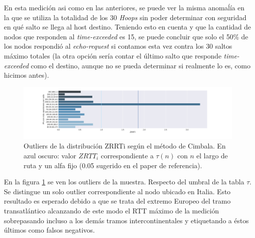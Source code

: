 En esta medición asi como en las anteriores, se puede ver la misma anomaĺía en la que se utiliza la totalidad de los 30 \emph{Hoops} sin poder determinar con seguridad en qué salto se llega al host destino. Teniendo esto en cuenta y que la cantidad de nodos que responden al \emph{time-exceeded} es 15, se puede concluir que solo el 50\% de los nodos respondió al \emph{echo-request} si contamos esta vez contra los 30 saltos máximo totales (la otra opción sería contar el último salto que responde \emph{time-exceeded} como el destino, aunque no se pueda determinar si realmente lo es, como hicimos antes).


\begin{figure}[H]
   \centering
       \includegraphics[width=1\textwidth, height=1\textheight, keepaspectratio]{../img/nuu-uz-zrtt}
 \caption{Outliers de la distribución ZRRTi según el método de Cimbala. En azul oscuro: valor $ZRTT_i$ correspondiente a $\tau(n)$ con $n$ el largo de ruta y un alfa fijo (0.05 sugerido en el paper de referencia).}
 \label{fig:nuu-uz-zrtt}
\end{figure}

En la figura \ref{fig:nuu-uz-zrtt} se ven los outliers de la muestra. Respecto del umbral de la tabla $\tau$. Se distingue un solo outlier correspondiente al nodo ubicado en Italia. Esto resultado es esperado debido a que se trata del extremo Europeo del tramo transatlántico alcanzando de este modo el RTT máximo de la medición sobrepasando incluso a los demás tramos intercontinentales y etiquetando a éstos últimos como falsos negativos.
